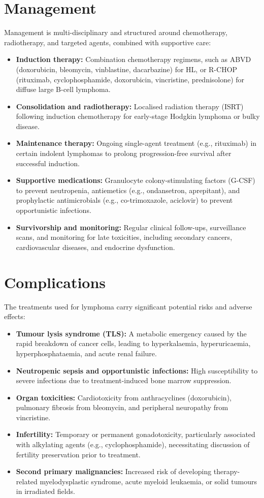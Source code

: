\section*{Management}
Management is multi-disciplinary and structured around chemotherapy, radiotherapy, and targeted agents, combined with supportive care:
\begin{itemize}
    \item \textbf{Induction therapy:} Combination chemotherapy regimens, such as ABVD (doxorubicin, bleomycin, vinblastine, dacarbazine) for HL, or R-CHOP (rituximab, cyclophosphamide, doxorubicin, vincristine, prednisolone) for diffuse large B-cell lymphoma.
    \item \textbf{Consolidation and radiotherapy:} Localised radiation therapy (ISRT) following induction chemotherapy for early-stage Hodgkin lymphoma or bulky disease.
    \item \textbf{Maintenance therapy:} Ongoing single-agent treatment (e.g., rituximab) in certain indolent lymphomas to prolong progression-free survival after successful induction.
    \item \textbf{Supportive medications:} Granulocyte colony-stimulating factors (G-CSF) to prevent neutropenia, antiemetics (e.g., ondansetron, aprepitant), and prophylactic antimicrobials (e.g., co-trimoxazole, aciclovir) to prevent opportunistic infections.
    \item \textbf{Survivorship and monitoring:} Regular clinical follow-ups, surveillance scans, and monitoring for late toxicities, including secondary cancers, cardiovascular diseases, and endocrine dysfunction.
\end{itemize}

\section*{Complications}
The treatments used for lymphoma carry significant potential risks and adverse effects:
\begin{itemize}
    \item \textbf{Tumour lysis syndrome (TLS):} A metabolic emergency caused by the rapid breakdown of cancer cells, leading to hyperkalaemia, hyperuricaemia, hyperphosphataemia, and acute renal failure.
    \item \textbf{Neutropenic sepsis and opportunistic infections:} High susceptibility to severe infections due to treatment-induced bone marrow suppression.
    \item \textbf{Organ toxicities:} Cardiotoxicity from anthracyclines (doxorubicin), pulmonary fibrosis from bleomycin, and peripheral neuropathy from vincristine.
    \item \textbf{Infertility:} Temporary or permanent gonadotoxicity, particularly associated with alkylating agents (e.g., cyclophosphamide), necessitating discussion of fertility preservation prior to treatment.
    \item \textbf{Second primary malignancies:} Increased risk of developing therapy-related myelodysplastic syndrome, acute myeloid leukaemia, or solid tumours in irradiated fields.
\end{itemize}


